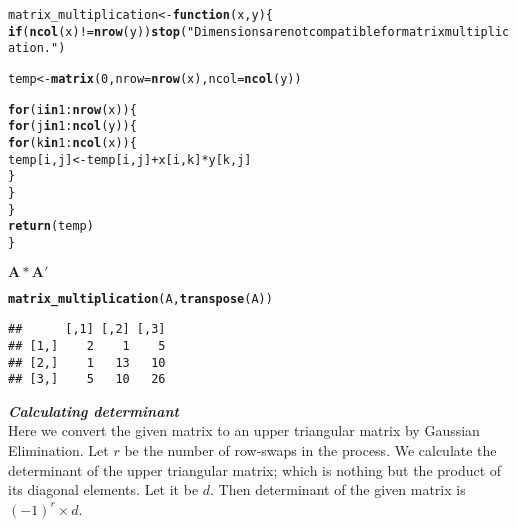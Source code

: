 \documentclass[11pt, a4paper]{article}\usepackage[]{graphicx}\usepackage[]{xcolor}
\makeatletter
\newcommand{\hlnum}[1]{\textcolor[rgb]{0.686,0.059,0.569}{#1}}%
\newcommand{\hlsng}[1]{\textcolor[rgb]{0.192,0.494,0.8}{#1}}%
\newcommand{\hlopt}[1]{\textcolor[rgb]{0,0,0}{#1}}%
\newcommand{\hldef}[1]{\textcolor[rgb]{0.345,0.345,0.345}{#1}}%
\newcommand{\hlkwa}[1]{\textcolor[rgb]{0.161,0.373,0.58}{\textbf{#1}}}%
\newcommand{\hlkwb}[1]{\textcolor[rgb]{0.69,0.353,0.396}{#1}}%
\newcommand{\hlkwc}[1]{\textcolor[rgb]{0.333,0.667,0.333}{#1}}%
\newcommand{\hlkwd}[1]{\textcolor[rgb]{0.737,0.353,0.396}{\textbf{#1}}}%
\newenvironment{kframe}{%
 \def\at@end@of@kframe{}%
 \ifinner\ifhmode%
  \def\at@end@of@kframe{\end{minipage}}%
  \begin{minipage}{\columnwidth}%
 \fi\fi%
 \def\FrameCommand##1{\hskip\@totalleftmargin \hskip-\fboxsep
 \colorbox{shadecolor}{##1}\hskip-\fboxsep
     \hskip-\linewidth \hskip-\@totalleftmargin \hskip\columnwidth}%
 \MakeFramed {\advance\hsize-\width
   \@totalleftmargin\z@ \linewidth\hsize
   \@setminipage}}%
 {\par\unskip\endMakeFramed%
 \at@end@of@kframe}
\newenvironment{knitrout}{}{} %
\makeatother
\begin{document}
\begin{knitrout}
\color{fgcolor}\begin{kframe}
\begin{alltt}
\hldef{matrix_multiplication} \hlkwb{<-} \hlkwa{function}\hldef{(}\hlkwc{x}\hldef{,} \hlkwc{y}\hldef{)\{}
  \hlkwa{if}\hldef{(}\hlkwd{ncol}\hldef{(x)} \hlopt{!=} \hlkwd{nrow}\hldef{(y))} \hlkwd{stop}\hldef{(}\hlsng{"Dimensions are not compatible for matrix multiplication."}\hldef{)}

  \hldef{temp} \hlkwb{<-} \hlkwd{matrix}\hldef{(}\hlnum{0}\hldef{,} \hlkwc{nrow} \hldef{=} \hlkwd{nrow}\hldef{(x),} \hlkwc{ncol} \hldef{=} \hlkwd{ncol}\hldef{(y))}

  \hlkwa{for} \hldef{(i} \hlkwa{in} \hlnum{1}\hlopt{:}\hlkwd{nrow}\hldef{(x)) \{}
    \hlkwa{for} \hldef{(j} \hlkwa{in} \hlnum{1}\hlopt{:}\hlkwd{ncol}\hldef{(y)) \{}
      \hlkwa{for} \hldef{(k} \hlkwa{in} \hlnum{1}\hlopt{:}\hlkwd{ncol}\hldef{(x)) \{}
        \hldef{temp[i, j]} \hlkwb{<-} \hldef{temp[i, j]} \hlopt{+} \hldef{x[i, k]} \hlopt{*} \hldef{y[k, j]}
      \hldef{\}}
    \hldef{\}}
  \hldef{\}}
  \hlkwd{return}\hldef{(temp)}
\hldef{\}}
\end{alltt}
\end{kframe}
\end{knitrout}

\newpage

\faArrowAltCircleRight[regular] $\mathbf{A * A'}$

\begin{knitrout}
\color{fgcolor}\begin{kframe}
\begin{alltt}
\hlkwd{matrix_multiplication}\hldef{(A,} \hlkwd{transpose}\hldef{(A))}
\end{alltt}
\begin{verbatim}
##      [,1] [,2] [,3]
## [1,]    2    1    5
## [2,]    1   13   10
## [3,]    5   10   26
\end{verbatim}
\end{kframe}
\end{knitrout}

\faArrowAltCircleRight[regular] \textit{\textbf{Calculating determinant}} \\

Here we convert the given matrix to an upper triangular matrix by Gaussian Elimination. Let $r$ be the number of row-swaps in the process. We calculate the determinant of the upper triangular matrix; which is nothing but the product of its diagonal elements. Let it be $d$. Then determinant of the given matrix is $(-1)^r \times d$.
\end{document}
